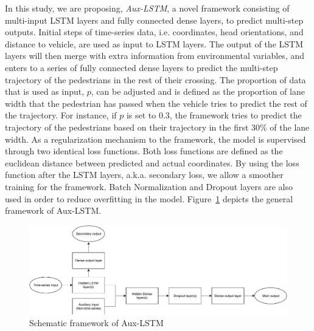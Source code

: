 In this study, we are proposing, \textit{Aux-LSTM}, a novel framework consisting of multi-input LSTM layers and fully connected dense layers, to predict multi-step outputs. Initial steps of time-series data, i.e. coordinates, head orientations, and distance to vehicle, are used as input to LSTM layers. The output of the LSTM layers will then merge with extra information from environmental variables, and enters to a series of fully connected dense layers to predict the multi-step trajectory of the pedestrians in the rest of their crossing. The proportion of data that is used as input, \(p\), can be adjusted and is defined as the proportion of lane width that the pedestrian has passed when the vehicle tries to predict the rest of the trajectory. For instance, if \(p\) is set to 0.3, the framework tries to predict the trajectory of the pedestrians based on their trajectory in the first 30\% of the lane width. As a regularization mechanism to the framework, the model is supervised through two identical loss functions. Both loss functions are defined as the euclidean distance between predicted and actual coordinates. By using the loss function after the LSTM layers, a.k.a. secondary loss, we allow a smoother training for the framework. Batch Normalization and Dropout layers are also used in order to reduce overfitting in the model. Figure~\ref{fig:frame} depicts the general framework of Aux-LSTM.
\begin{figure}[!h]
    \centering
    \includegraphics[scale=0.6]{chapter_6/figures/frame.pdf}
    \caption{Schematic framework of Aux-LSTM}
    \label{fig:frame}
\end{figure}